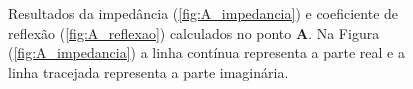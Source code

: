 
\newcommand\scalex{1}
\newcommand\scaley{1}
\newcommand\scaleA{0.5}

\begin{figure}
\begin{subfigure}{\scaleA \textwidth}
  
\end{subfigure}%
\begin{subfigure}{\scaleA \textwidth}
  
\end{subfigure}
\caption[Resultados de reflexão no ponto \textbf{A}]{Resultados da impedância (\ref{fig:A_impedancia}) e coeficiente de reflexão (\ref{fig:A_reflexao}) calculados no ponto $\textbf{A}$. Na Figura (\ref{fig:A_impedancia}) a linha contínua representa a parte real e a linha tracejada representa a parte imaginária.}
\label{fig:resultados_A}
\end{figure}


